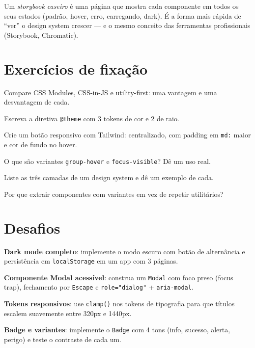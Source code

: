 \begin{caixadica}
Um \emph{storybook caseiro} é uma página que mostra cada componente em todos
os seus estados (padrão, hover, erro, carregando, dark). É a forma mais
rápida de ``ver'' o design system crescer — e o mesmo conceito das
ferramentas profissionais (Storybook, Chromatic).
\end{caixadica}

\section{Exercícios de fixação}

\begin{exercicios}
  \item Compare CSS Modules, CSS-in-JS e utility-first: uma vantagem e uma desvantagem de cada.
  \item Escreva a diretiva \texttt{@theme} com 3 tokens de cor e 2 de raio.
  \item Crie um botão responsivo com Tailwind: centralizado, com padding em \texttt{md:} maior e cor de fundo no hover.
  \item O que são variantes \texttt{group-hover} e \texttt{focus-visible}? Dê um uso real.
  \item Liste as três camadas de um design system e dê um exemplo de cada.
  \item Por que extrair componentes com variantes em vez de repetir utilitários?
\end{exercicios}

\section{Desafios}

\begin{desafios}
  \item \textbf{Dark mode completo}: implemente o modo escuro com botão de alternância e persistência em \texttt{localStorage} em um app com 3 páginas.
  \item \textbf{Componente Modal acessível}: construa um \texttt{Modal} com foco preso (focus trap), fechamento por \texttt{Escape} e \texttt{role="dialog"} + \texttt{aria-modal}.
  \item \textbf{Tokens responsivos}: use \texttt{clamp()} nos tokens de tipografia para que títulos escalem suavemente entre 320px e 1440px.
  \item \textbf{Badge e variantes}: implemente o \texttt{Badge} com 4 tons (info, sucesso, alerta, perigo) e teste o contraste de cada um.
\end{desafios}

